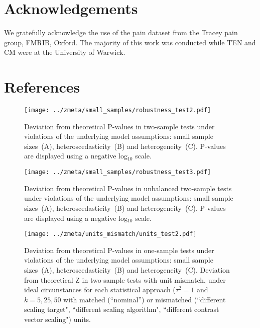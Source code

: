 \documentclass[preprint]{elsarticle}
\newcommand{\nStudies}{k}
\newcommand{\varBetween}{\tau^2}
\newcommand{\beginsupplement}{%
        \setcounter{table}{0}
        \renewcommand{\thetable}{S\arabic{table}}%
        \setcounter{figure}{0}
        \renewcommand{\thefigure}{S\arabic{figure}}%
     }
\begin{document}
\section{Acknowledgements}
We gratefully acknowledge the use of the pain dataset from the Tracey pain group, FMRIB, Oxford. The majority of this work was conducted while TEN and CM were at the University of Warwick.

%

\section{References}



\beginsupplement


\begin{figure}[h]
	\centering
 	\texttt{[image: ../zmeta/small\_samples/robustness\_test2.pdf]}
	\caption{Deviation from theoretical P-values in two-sample tests under violations of the underlying model assumptions: small sample sizes~(A), heteroscedasticity~(B) and heterogeneity~(C). P-values are displayed using a negative log$_{10}$ scale.}
	\label{fig:robustness_test2}
\end{figure}

\begin{figure}[h]
	\centering
 	\texttt{[image: ../zmeta/small\_samples/robustness\_test3.pdf]}
	\caption{Deviation from theoretical P-values in unbalanced two-sample tests under violations of the underlying model assumptions: small sample sizes~(A), heteroscedasticity~(B) and heterogeneity~(C). P-values are displayed using a negative log$_{10}$ scale.}
	\label{fig:robustness_test3}
\end{figure}

\begin{figure}[h]
	\centering
 	\texttt{[image: ../zmeta/units\_mismatch/units\_test2.pdf]}
	\caption{Deviation from theoretical P-values in one-sample tests under violations of the underlying model assumptions: small sample sizes~(A), heteroscedasticity~(B) and heterogeneity~(C). Deviation from theoretical Z in two-sample tests with unit mismatch, under ideal circunstances for each statistical approach ($\varBetween=1$ and $\nStudies = 5, 25, 50$ with matched (``nominal'') or mismatched (``different scaling target", ``different scaling algorithm", ``different contrast vector scaling") units.}
	\label{fig:units_test2}
\end{figure}
\end{document}
